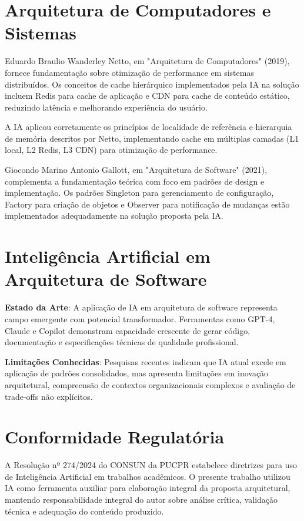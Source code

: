 \section{Arquitetura de Computadores e Sistemas}

Eduardo Braulio Wanderley Netto, em "Arquitetura de Computadores" (2019), fornece fundamentação sobre otimização de performance em sistemas distribuídos. Os conceitos de cache hierárquico implementados pela IA na solução incluem Redis para cache de aplicação e CDN para cache de conteúdo estático, reduzindo latência e melhorando experiência do usuário.

A IA aplicou corretamente os princípios de localidade de referência e hierarquia de memória descritos por Netto, implementando cache em múltiplas camadas (L1 local, L2 Redis, L3 CDN) para otimização de performance.

Giocondo Marino Antonio Gallott, em "Arquitetura de Software" (2021), complementa a fundamentação teórica com foco em padrões de design e implementação. Os padrões Singleton para gerenciamento de configuração, Factory para criação de objetos e Observer para notificação de mudanças estão implementados adequadamente na solução proposta pela IA.

\section{Inteligência Artificial em Arquitetura de Software}

\textbf{Estado da Arte}: A aplicação de IA em arquitetura de software representa campo emergente com potencial transformador. Ferramentas como GPT-4, Claude e Copilot demonstram capacidade crescente de gerar código, documentação e especificações técnicas de qualidade profissional.

\textbf{Limitações Conhecidas}: Pesquisas recentes indicam que IA atual excele em aplicação de padrões consolidados, mas apresenta limitações em inovação arquitetural, compreensão de contextos organizacionais complexos e avaliação de trade-offs não explícitos.

\section{Conformidade Regulatória}

A Resolução nº 274/2024 do CONSUN da PUCPR estabelece diretrizes para uso de Inteligência Artificial em trabalhos acadêmicos. O presente trabalho utilizou IA como ferramenta auxiliar para elaboração integral da proposta arquitetural, mantendo responsabilidade integral do autor sobre análise crítica, validação técnica e adequação do conteúdo produzido.

